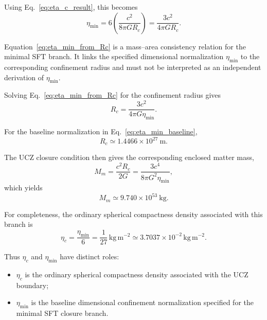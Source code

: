 \documentclass[12pt]{article}
\begin{document}
Using Eq.~\eqref{eq:eta_c_result}, this becomes
\begin{equation}
\boxed{
\eta_{\min}
=
6\left(
\frac{c^2}{8\pi G R_c}
\right)
=
\frac{3c^2}{4\pi G R_c}.
}
\label{eq:eta_min_from_Rc}
\end{equation}

Equation~\eqref{eq:eta_min_from_Rc} is a mass--area consistency relation
for the minimal SFT branch. It links the specified dimensional
normalization $\eta_{\min}$ to the corresponding confinement radius and
must not be interpreted as an independent derivation of
$\eta_{\min}$.

Solving Eq.~\eqref{eq:eta_min_from_Rc} for the confinement radius gives
\begin{equation}
\boxed{
R_c
=
\frac{3c^2}{4\pi G\eta_{\min}}.
}
\label{eq:Rc_from_eta_min}
\end{equation}

For the baseline normalization in
Eq.~\eqref{eq:eta_min_baseline},
\begin{equation}
R_c
\simeq
1.4466\times10^{27}\ \mathrm{m}.
\end{equation}

The UCZ closure condition then gives the corresponding enclosed matter
mass,
\begin{equation}
M_m
=
\frac{c^2R_c}{2G}
=
\frac{3c^4}{8\pi G^2\eta_{\min}},
\label{eq:Mm_from_eta_min}
\end{equation}
which yields
\begin{equation}
M_m
\simeq
9.740\times10^{53}\ \mathrm{kg}.
\end{equation}

For completeness, the ordinary spherical compactness density associated
with this branch is
\begin{equation}
\eta_c
=
\frac{\eta_{\min}}{6}
=
\frac{1}{27}\,\mathrm{kg\,m^{-2}}
\simeq
3.7037\times10^{-2}\,\mathrm{kg\,m^{-2}}.
\end{equation}

Thus $\eta_c$ and $\eta_{\min}$ have distinct roles:
\begin{itemize}
\item $\eta_c$ is the ordinary spherical compactness density associated
with the UCZ boundary;
\item $\eta_{\min}$ is the baseline dimensional confinement normalization
specified for the minimal SFT closure branch.
\end{itemize}
\end{document}
